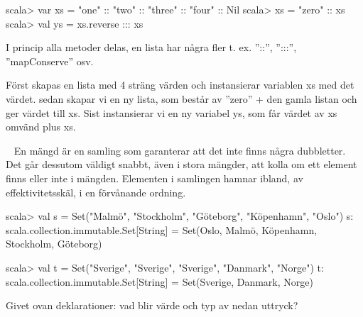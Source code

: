 {{\begin{REPL}
scala> var xs = "one" :: "two" :: "three" :: "four" :: Nil
scala> xs = "zero" :: xs
scala> val ys = xs.reverse ::: xs
\end{REPL}


\SOLUTION


\TaskSolved \what
 

\SubtaskSolved 
I princip alla metoder delas, en lista har några fler t. ex. ''::'', '':::'', ''mapConserve'' osv.

\SubtaskSolved 
Först skapas en lista med 4 sträng värden och instansierar variablen xs med det värdet.
sedan skapar vi en ny lista, som består av ''zero'' + den gamla listan och ger värdet till xs.
Sist instansierar vi en ny variabel ys, som får värdet av xs omvänd plus xs.


\QUESTEND









\QUESTBEGIN

\Task  \what~  En mängd är en samling som garanterar att det inte finns några dubbletter. Det går dessutom väldigt snabbt, även i stora mängder, att kolla om ett element finns eller inte i mängden. Elementen i samlingen  hamnar ibland, av effektivitetsskäl, i en förvånande ordning.
\begin{REPL}
scala> val s = Set("Malmö", "Stockholm", "Göteborg", "Köpenhamn", "Oslo")
s: scala.collection.immutable.Set[String] =
     Set(Oslo, Malmö, Köpenhamn, Stockholm, Göteborg)

scala> val t = Set("Sverige", "Sverige", "Sverige", "Danmark", "Norge")
t: scala.collection.immutable.Set[String] = Set(Sverige, Danmark, Norge)
\end{REPL}
Givet ovan deklarationer: vad blir värde och typ av nedan uttryck?

\Subtask {}

\Subtask {}

\Subtask {}

\Subtask {}

\Subtask {}

\Subtask {}

\Subtask {}

\Subtask {}

}}

